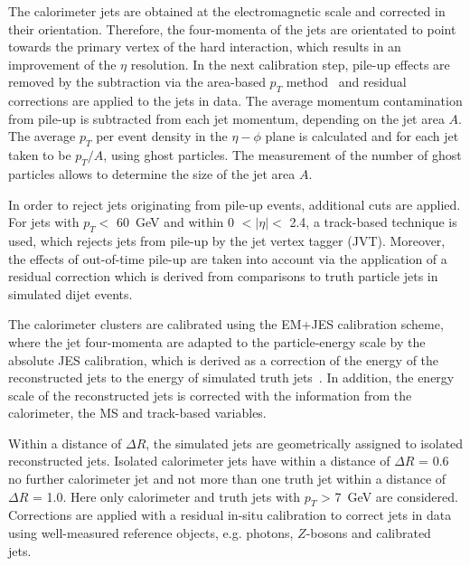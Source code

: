  
 The calorimeter jets are obtained at the electromagnetic scale  and corrected in their orientation.
 Therefore, the four-momenta of the jets are orientated to point towards the primary vertex of the hard interaction, which results in an improvement of the $\eta$ resolution.  In the next calibration step, pile-up effects are removed  by the subtraction via the area-based $p_T$ method~\cite{Cacciari:2007fd} and  residual corrections are applied to the  jets in data.  The  average momentum contamination from pile-up is subtracted from each jet momentum, depending on the jet area $A$. The average $p_T$ per event density in the $\eta-\phi$ plane is calculated and for each jet taken to be $p_T/A$, using ghost particles. The measurement of the number of ghost particles  allows to determine the size of the  jet area $A$.~\cite{Aaboud:2017jcu}

 In order to reject jets originating from pile-up events,  additional cuts are applied. For jets with  $p_T <$ 60~GeV and within  0 $<\mid \eta \mid<$ 2.4,  a track-based technique is used, which rejects  jets from pile-up by the jet vertex tagger (JVT). Moreover, the effects of out-of-time pile-up are taken into account via the application of  a residual correction  which is derived from comparisons to truth particle jets in simulated dijet events.~\cite{Aad:2015ina}


 The calorimeter clusters are calibrated using the EM+JES calibration scheme, where the jet four-momenta are adapted to the particle-energy scale by the absolute JES calibration, which is derived as a correction of the energy of the reconstructed jets to the energy of simulated truth jets~\cite{Aad:2014bia}.
 In addition, the energy scale of the reconstructed jets is corrected with the information from the calorimeter, the MS and track-based variables.
 
 
 
  Within a distance of $\Delta R$, the simulated jets are geometrically assigned to isolated reconstructed jets. Isolated calorimeter jets have within a distance of $\Delta R$ = 0.6 no further calorimeter jet  and not more than one truth jet within a distance of $\Delta R$ = 1.0.  Here only calorimeter and truth jets with  $p_T$ > 7~GeV are considered. Corrections are applied with a residual in-situ calibration to correct jets in data using well-measured reference objects, e.g.  photons, $Z$-bosons and calibrated jets.~\cite{Aaboud:2017jcu}
  
